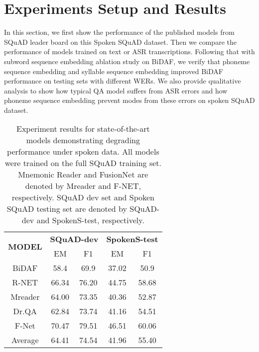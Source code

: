 \documentclass[a4paper]{article}
\begin{document}
\section{Experiments Setup and Results}
In this section, we first show the performance  of the published models from SQuAD leader board on this Spoken SQuAD dataset. 
Then we compare the performance  of models trained on text or ASR transcriptions. 
Following that with subword sequence embedding ablation study on BiDAF, we verify that phoneme sequence embedding and syllable sequence embedding improved BiDAF performance on testing sets with different WERs. 
We also provide qualitative analysis to show how typical QA model suffers from ASR errors and how phoneme sequence embedding prevent modes from these errors on spoken SQuAD dataset. 

\begin{table}[]
\centering
\caption{Experiment results for state-of-the-art models demonstrating degrading performance under spoken data. All models were trained on the full  SQuAD training set. Mnemonic Reader and FusionNet are denoted by Mreader and F-NET, respectively.  SQuAD dev set and Spoken SQuAD testing set are denoted by SQuAD-dev and SpokenS-test, respectively.}
\label{tab:stateoftheart}
\begin{tabular}{|c|c|c|c|c|}
\hline
\multicolumn{1}{|c|}{\multirow{2}{*}{\textbf{MODEL}}} &
\multicolumn{2}{|c|}{\textbf{SQuAD-dev}} & \multicolumn{2}{|c|}{\textbf{SpokenS-test}}  \\
 \cline{2-3}\cline{4-5}
\multicolumn{1}{|c|}{} & EM & F1 & EM & F1 \\
\hline
\hline
BiDAF & 58.4 & 69.9 & 37.02 & 50.9   \\
R-NET  &66.34 & 76.20 & 44.75 & 58.68 \\
Mreader & 64.00 & 73.35 &  40.36 & 52.87   \\
Dr.QA & 62.84 & 73.74 & 41.16 & 54.51\\
F-Net & 70.47 & 79.51 & 46.51 & 60.06 \\
\hline
Average & 64.41 & 74.54 & 41.96 & 55.40 \\
\hline
\end{tabular}
\end{table}
\end{document}
